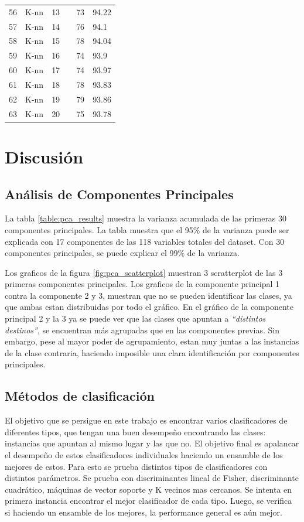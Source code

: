 \documentclass[journal]{IEEEtran}
\begin{document}
\begin{table}[!hb]
\begin{tabular}{l | l l l | l l}
	56	&	K-nn	&	13	&		&	73	&	94.22 \\
	57	&	K-nn	&	14	&		&	76	&	94.1 \\
	58	&	K-nn	&	15	&		&	78	&	94.04 \\
	59	&	K-nn	&	16	&		&	74	&	93.9 \\
	60	&	K-nn	&	17	&		&	74	&	93.97 \\
	61	&	K-nn	&	18	&		&	78	&	93.83 \\
	62	&	K-nn	&	19	&		&	79	&	93.86 \\
	63	&	K-nn	&	20	&		&	75	&	93.78 \\
\end{tabular}
\end{table}


\section{Discusión}
\subsection{Análisis de Componentes Principales}
La tabla \ref{table:pca_results} muestra la varianza acumulada de las
primeras 30 componentes principales. La tabla muestra que el 95\%
de la varianza puede ser explicada con 17 componentes de las 118 variables
totales del dataset. Con 30 componentes principales, se puede explicar
el 99\% de la varianza.

Los graficos de la figura \ref{fig:pca_scatterplot} muestran 3 scratterplot de
las 3 primeras componentes principales. Los graficos de la componente principal 1 
contra la componente 2 y 3, muestran que no se pueden identificar las clases, ya
que ambas estan distribuidas por todo el gráfico. En el gráfico de la
componente principal 2 y la 3 ya se puede ver que las clases que apuntan
a \textit{``distintos destinos''}, se encuentran más agrupadas que en las componentes
previas. Sin embargo, pese al mayor poder de agrupamiento, estan muy juntas a
las instancias de la clase contraria, haciendo imposible una clara identificación por
componentes principales.

\subsection{Métodos de clasificación}
El objetivo que se persigue en este trabajo es encontrar varios clasificadores
de diferentes tipos, que tengan una buen desempeño encontrando las clases:
instancias que apuntan al mismo lugar y las que no. El objetivo final es apalancar
el desempeño de estos clasificadores individuales haciendo un ensamble
de los mejores de estos. 
Para esto se prueba distintos tipos de clasificadores con distintos parámetros.
Se prueba con discriminantes lineal de Fisher, discriminante cuadrático,
máquinas de vector soporte y K vecinos mas cercanos. Se intenta en primera 
instancia encontrar el mejor clasificador de cada tipo. Luego, se verifica si
haciendo un ensamble de los mejores, la performance general es aún mejor.
\end{document}
